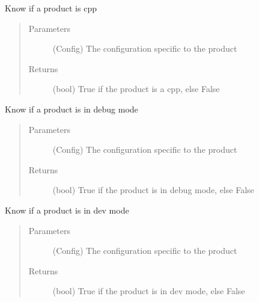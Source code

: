 \documentclass[a4paper,10pt,english]{sphinxmanual}
\begin{document}
\begin{fulllineitems}
\label{\detokenize{apidoc_src/src:src.product.product_is_cpp}}
Know if a product is cpp
\begin{quote}\begin{description}
\item[{Parameters}] \leavevmode
{} \textendash{} (Config)
The configuration specific to the product

\item[{Returns}] \leavevmode
(bool) 
True if the product is a cpp, else False

\end{description}\end{quote}

\end{fulllineitems}


\begin{fulllineitems}
\label{\detokenize{apidoc_src/src:src.product.product_is_debug}}
Know if a product is in debug mode
\begin{quote}\begin{description}
\item[{Parameters}] \leavevmode
{} \textendash{} (Config)
The configuration specific to the product

\item[{Returns}] \leavevmode
(bool) 
True if the product is in debug mode, else False

\end{description}\end{quote}

\end{fulllineitems}


\begin{fulllineitems}
\label{\detokenize{apidoc_src/src:src.product.product_is_dev}}
Know if a product is in dev mode
\begin{quote}\begin{description}
\item[{Parameters}] \leavevmode
{} \textendash{} (Config)
The configuration specific to the product

\item[{Returns}] \leavevmode
(bool) 
True if the product is in dev mode, else False

\end{description}\end{quote}

\end{fulllineitems}
\end{document}
